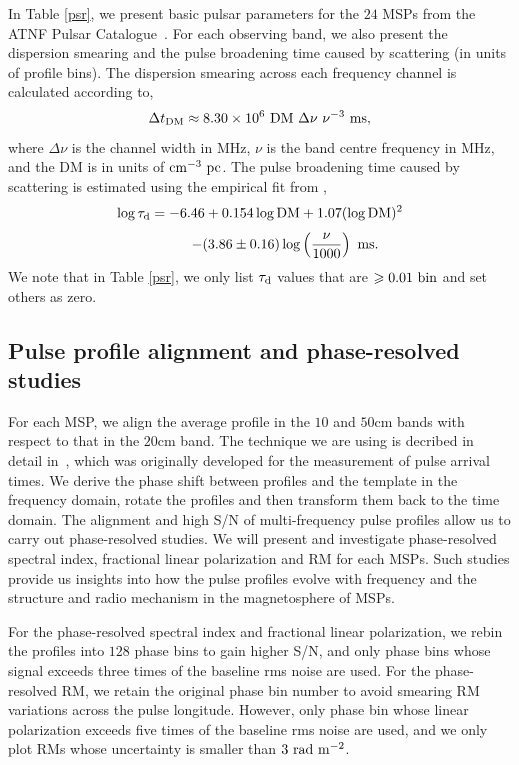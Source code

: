 \documentclass[useAMS,usenatbib]{mn2e}
\begin{document}
In Table \ref{psr}, we present basic pulsar parameters for the $24$ MSPs
from the ATNF Pulsar Catalogue~\citep{Manchester05}.
%
For each observing band, we also present the dispersion smearing and the pulse 
broadening time caused by scattering (in units of profile bins).
%
The dispersion smearing across each frequency channel is calculated according to, 
%
\begin{equation}
\Delta t_{\rm{DM}}\approx 8.30 \times 10^{6}\ \rm{DM}\ \Delta \nu\ \nu^{-3}\ \rm{ms},
\end{equation}
%
where $\Delta \nu$ is the channel width in MHz, $\nu$ is the band centre frequency in MHz, 
and the DM is in units of $\rm{cm^{-3}\ pc}$.
%
The pulse broadening time caused by scattering is estimated using the empirical fit 
from \citet{Bhat04}, 
%
\[
\log \tau_{\rm{d}} = -6.46+0.154\log\rm{DM}+1.07(\log\rm{DM})^2
\]
%
\begin{equation}
	\qquad\quad\ \ -(3.86\pm0.16)\log\left(\frac{\nu}{1000}\right)\ \rm{ms}.
\end{equation}
%
We note that in Table \ref{psr}, we only list $\tau_{\rm{d}}$ values that are 
$\ge 0.01\ \rm{bin}$ and set others as zero.


\subsection{Pulse profile alignment and phase-resolved studies}

For each MSP, we align the average profile in the $10$ and $50$cm bands with 
respect to that in the $20$cm band.
%
The technique we are using is decribed in detail in~\citet{Taylor92}, which 
was originally developed for the measurement of pulse arrival times.
%
We derive the phase shift between profiles and the template in the 
frequency domain, rotate the profiles and then transform them back to 
the time domain.
%
The alignment and high S/N of multi-frequency pulse profiles allow us 
to carry out phase-resolved studies. 
%
We will present and investigate phase-resolved spectral index, fractional 
linear polarization and RM for each MSPs.
%
Such studies provide us insights into how the pulse profiles evolve with 
frequency and the structure and radio mechanism in the magnetosphere of 
MSPs.
%

For the phase-resolved spectral index and fractional linear polarization, 
we rebin the profiles into $128$ phase bins to gain higher S/N, and only 
phase bins whose signal exceeds three times of the baseline rms noise 
are used.
%
For the phase-resolved RM, we retain the original phase bin number to 
avoid smearing RM variations across the pulse longitude. However, only 
phase bin whose linear polarization exceeds five times of the baseline 
rms noise are used, and we only plot RMs whose uncertainty is smaller than 
$3\ \rm{rad\ m^{-2}}$.
%
\end{document}

